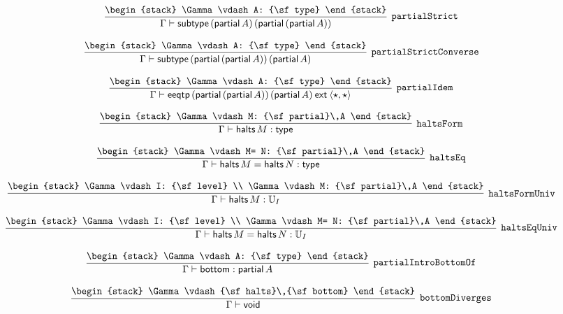 \[
\infer[{\tt partialStrict}]{\Gamma \vdash {\sf subtype}\,({\sf partial}\,A)\,({\sf partial}\,({\sf partial}\,A))}{
\begin{stack}
\Gamma \vdash A: {\sf type}
\end{stack}}
\]

\[
\infer[{\tt partialStrictConverse}]{\Gamma \vdash {\sf subtype}\,({\sf partial}\,({\sf partial}\,A))\,({\sf partial}\,A)}{
\begin{stack}
\Gamma \vdash A: {\sf type}
\end{stack}}
\]

\[
\infer[{\tt partialIdem}]{\Gamma \vdash {\sf eeqtp}\,({\sf partial}\,({\sf partial}\,A))\,({\sf partial}\,A)\:{\sf ext}\:\langle \star ,\star \rangle }{
\begin{stack}
\Gamma \vdash A: {\sf type}
\end{stack}}
\]

\[
\infer[{\tt haltsForm}]{\Gamma \vdash {\sf halts}\,M: {\sf type}}{
\begin{stack}
\Gamma \vdash M: {\sf partial}\,A
\end{stack}}
\]

\[
\infer[{\tt haltsEq}]{\Gamma \vdash {\sf halts}\,M= {\sf halts}\,N: {\sf type}}{
\begin{stack}
\Gamma \vdash M= N: {\sf partial}\,A
\end{stack}}
\]

\[
\infer[{\tt haltsFormUniv}]{\Gamma \vdash {\sf halts}\,M: {\Bbb U}_{I}}{
\begin{stack}
\Gamma \vdash I: {\sf level}
\\
\Gamma \vdash M: {\sf partial}\,A
\end{stack}}
\]

\[
\infer[{\tt haltsEqUniv}]{\Gamma \vdash {\sf halts}\,M= {\sf halts}\,N: {\Bbb U}_{I}}{
\begin{stack}
\Gamma \vdash I: {\sf level}
\\
\Gamma \vdash M= N: {\sf partial}\,A
\end{stack}}
\]

\[
\infer[{\tt partialIntroBottomOf}]{\Gamma \vdash {\sf bottom}: {\sf partial}\,A}{
\begin{stack}
\Gamma \vdash A: {\sf type}
\end{stack}}
\]

\[
\infer[{\tt bottomDiverges}]{\Gamma \vdash {\sf void}}{
\begin{stack}
\Gamma \vdash {\sf halts}\,{\sf bottom}
\end{stack}}
\]


